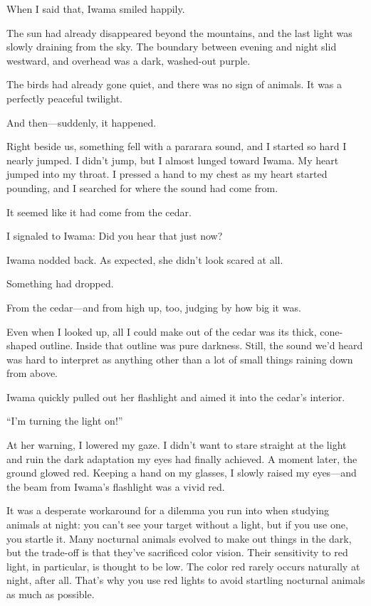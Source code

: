 \documentclass[
    a4paper,
    12pt,
    twoside,
    openany,
    UTF8,
    fontset=windows
]{ctexbook}
\begin{document}
When I said that, Iwama smiled happily.

The sun had already disappeared beyond the mountains, and the last light was slowly draining from the sky. The boundary between evening and night slid westward, and overhead was a dark, washed-out purple.

The birds had already gone quiet, and there was no sign of animals. It was a perfectly peaceful twilight.

And then—suddenly, it happened.

Right beside us, something fell with a pararara sound, and I started so hard I nearly jumped. I didn’t jump, but I almost lunged toward Iwama. My heart jumped into my throat. I pressed a hand to my chest as my heart started pounding, and I searched for where the sound had come from.

It seemed like it had come from the cedar.

I signaled to Iwama: Did you hear that just now?

Iwama nodded back. As expected, she didn’t look scared at all.

Something had dropped.

From the cedar—and from high up, too, judging by how big it was.

Even when I looked up, all I could make out of the cedar was its thick, cone-shaped outline. Inside that outline was pure darkness. Still, the sound we’d heard was hard to interpret as anything other than a lot of small things raining down from above.

Iwama quickly pulled out her flashlight and aimed it into the cedar’s interior.

“I’m turning the light on!”

At her warning, I lowered my gaze. I didn’t want to stare straight at the light and ruin the dark adaptation my eyes had finally achieved. A moment later, the ground glowed red. Keeping a hand on my glasses, I slowly raised my eyes—and the beam from Iwama’s flashlight was a vivid red.

It was a desperate workaround for a dilemma you run into when studying animals at night: you can’t see your target without a light, but if you use one, you startle it. Many nocturnal animals evolved to make out things in the dark, but the trade-off is that they’ve sacrificed color vision. Their sensitivity to red light, in particular, is thought to be low. The color red rarely occurs naturally at night, after all. That’s why you use red lights to avoid startling nocturnal animals as much as possible.
\end{document}
